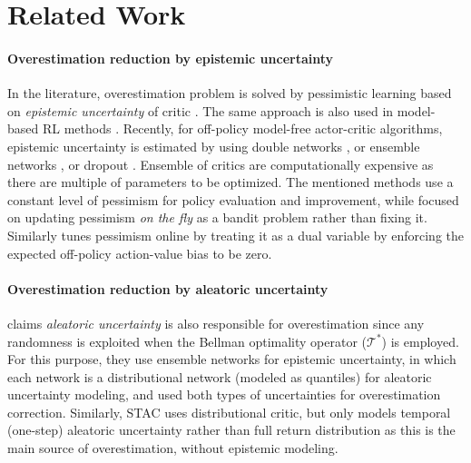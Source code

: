 \documentclass[10pt]{article} %
\begin{document}
\section{Related Work}

\paragraph{Overestimation reduction by epistemic uncertainty} In the literature, overestimation problem is solved by pessimistic learning based on \textit{epistemic uncertainty} of critic \citep{chen2021randomized, hiraoka2021dropout}. The same approach is also used in model-based RL methods \citep{janner2019trust, chua2018deep, depeweg2016learning}. Recently, for off-policy model-free actor-critic algorithms, epistemic uncertainty is estimated by using double networks \citep{fujimoto2018addressing, haarnoja2018soft}, or ensemble networks \citep{chen2021randomized, moskovitz2021tactical}, or dropout \citep{hiraoka2021dropout}. Ensemble of critics are computationally expensive as there are multiple of parameters to be optimized. The mentioned methods use a constant level of pessimism for policy evaluation and improvement, while \citet{moskovitz2021tactical} focused on updating pessimism \textit{on the fly} as a bandit problem rather than fixing it. Similarly \citet{cetin2023learning} tunes pessimism online by treating it as a dual variable  by enforcing the expected off-policy action-value bias to be zero. 

\paragraph{Overestimation reduction by aleatoric uncertainty}  
\citet{kuznetsov2020controlling} claims \textit{aleatoric uncertainty} is also responsible for overestimation since any randomness is exploited when the Bellman optimality operator ($\mathcal{T}^*$) is employed. For this purpose, they use ensemble networks for epistemic uncertainty, in which each network is a distributional network (modeled as quantiles) for aleatoric uncertainty modeling, and used both types of uncertainties for overestimation correction. Similarly, STAC uses distributional critic, but only models temporal (one-step) aleatoric uncertainty rather than full return distribution as this is the main source of overestimation, without epistemic modeling. 
\end{document}
